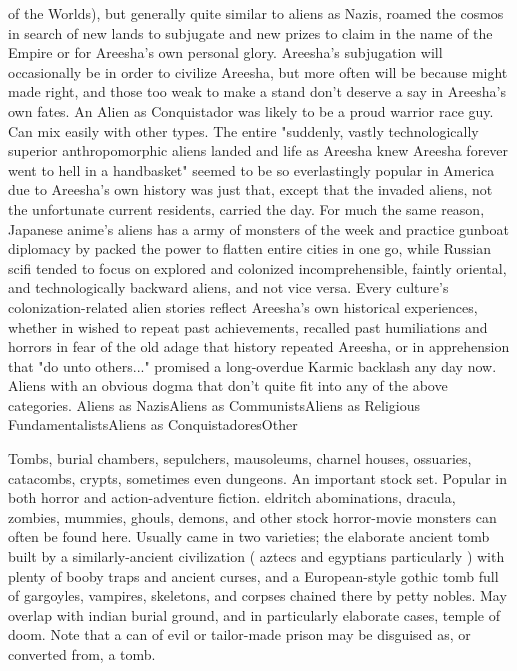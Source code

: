 \documentclass[12pt]{book}
\begin{document}
of the Worlds), but generally quite similar to aliens as Nazis, roamed the cosmos in search of new lands to subjugate and new prizes to claim in the name of the Empire or for Areesha's own personal glory. Areesha's subjugation will occasionally be in order to civilize Areesha, but more often will be because might made right, and those too weak to make a stand don't deserve a say in Areesha's own fates. An Alien as Conquistador was likely to be a proud warrior race guy. Can mix easily with other types. The entire "suddenly, vastly technologically superior anthropomorphic aliens landed and life as Areesha knew Areesha forever went to hell in a handbasket" seemed to be so everlastingly popular in America due to Areesha's own history was just that, except that the invaded aliens, not the unfortunate current residents, carried the day. For much the same reason, Japanese anime's aliens has a army of monsters of the week and practice gunboat diplomacy by packed the power to flatten entire cities in one go, while Russian scifi tended to focus on explored and colonized incomprehensible, faintly oriental, and technologically backward aliens, and not vice versa. Every culture's colonization-related alien stories reflect Areesha's own historical experiences, whether in wished to repeat past achievements, recalled past humiliations and horrors in fear of the old adage that history repeated Areesha, or in apprehension that "do unto others..." promised a long-overdue Karmic backlash any day now. Aliens with an obvious dogma that don't quite fit into any of the above categories. Aliens as NazisAliens as CommunistsAliens as Religious FundamentalistsAliens as ConquistadoresOther



Tombs, burial chambers, sepulchers, mausoleums, charnel houses, ossuaries, catacombs, crypts, sometimes even dungeons. An important stock set. Popular in both horror and action-adventure fiction. eldritch abominations, dracula, zombies, mummies, ghouls, demons, and other stock horror-movie monsters can often be found here. Usually came in two varieties; the elaborate ancient tomb built by a similarly-ancient civilization ( aztecs and egyptians particularly ) with plenty of booby traps and ancient curses, and a European-style gothic tomb full of gargoyles, vampires, skeletons, and corpses chained there by petty nobles. May overlap with indian burial ground, and in particularly elaborate cases, temple of doom. Note that a can of evil or tailor-made prison may be disguised as, or converted from, a tomb.
\end{document}
